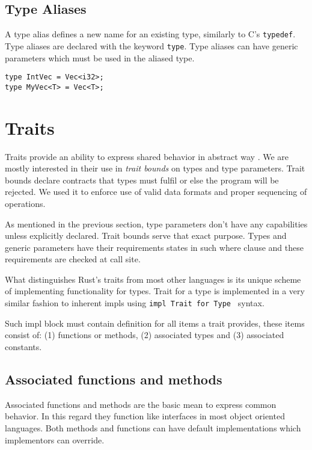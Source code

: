 \subsection{Type Aliases}

A type alias defines a new name for an existing type, similarly to C's \texttt{typedef}. Type aliases are declared with the keyword \texttt{type}.
Type aliases can have generic parameters which must be used in the aliased type.

\begin{lstlisting}
type IntVec = Vec<i32>;
type MyVec<T> = Vec<T>;
\end{lstlisting}

\section{Traits}
\label{sec:traits}

Traits provide an ability to express shared behavior in abstract way \cite{rustbook}. We are mostly interested in their use in \textit{trait bounds} on types and type parameters.
Trait bounds declare contracts that types must fulfil or else the program will be rejected. 
We used it to enforce use of valid data formats and proper sequencing of operations.

As mentioned in the previous section, type parameters don't have any capabilities unless explicitly declared. Trait bounds serve that exact purpose.
Types and generic parameters have their requirements states in such where clause and these requirements are checked at call site.

What distinguishes Rust's traits from most other languages is its unique scheme of implementing functionality for types.
Trait for a type is implemented in a very similar fashion to inherent impls using \texttt{impl Trait for Type } syntax.

Such impl block must contain definition for all items a trait provides, these items consist of: (1) functions or methods, (2) associated types and (3) associated constants. 

\subsection{Associated functions and methods}

Associated functions and methods are the basic mean to express common behavior.
In this regard they function like interfaces in most object oriented languages.
Both methods and functions can have default implementations which implementors can override.

